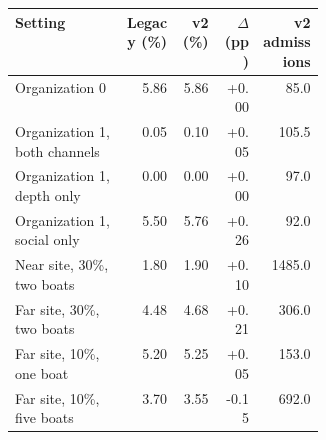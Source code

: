 \begin{tabular}{L{0.36\linewidth}rrrr}
\toprule
Setting & Legacy (\%) & v2 (\%) & $\Delta$ (pp) & v2 admissions \\
\midrule
Organization 0 & 5.86 & 5.86 & +0.00 & 85.0 \\
Organization 1, both channels & 0.05 & 0.10 & +0.05 & 105.5 \\
Organization 1, depth only & 0.00 & 0.00 & +0.00 & 97.0 \\
Organization 1, social only & 5.50 & 5.76 & +0.26 & 92.0 \\
Near site, 30\%, two boats & 1.80 & 1.90 & +0.10 & 1485.0 \\
Far site, 30\%, two boats & 4.48 & 4.68 & +0.21 & 306.0 \\
Far site, 10\%, one boat & 5.20 & 5.25 & +0.05 & 153.0 \\
Far site, 10\%, five boats & 3.70 & 3.55 & -0.15 & 692.0 \\
\bottomrule
\end{tabular}
